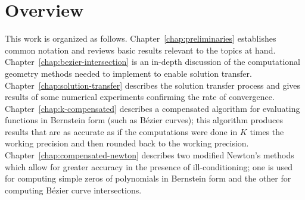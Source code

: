 \section{Overview}

This work is organized as follows. Chapter~\ref{chap:preliminaries}
establishes common notation and reviews basic results relevant to the
topics at hand. Chapter~\ref{chap:bezier-intersection} is an
in-depth discussion of the computational geometry methods needed
to implement to enable solution transfer. Chapter~\ref{chap:solution-transfer}
describes the solution transfer process and gives results of some
numerical experiments confirming the rate of convergence.
Chapter~\ref{chap:k-compensated} describes a compensated algorithm for
evaluating functions in Bernstein form (such as B\'{e}zier curves);
this algorithm produces results that are as accurate as if
the computations were done in \(K\) times the working precision
and then rounded back to the working precision.
Chapter~\ref{chap:compensated-newton} describes two modified Newton's
methods which allow for greater accuracy in the presence of
ill-conditioning; one is used for computing simple zeros
of polynomials in Bernstein form and the other for computing
B\'{e}zier curve intersections.
